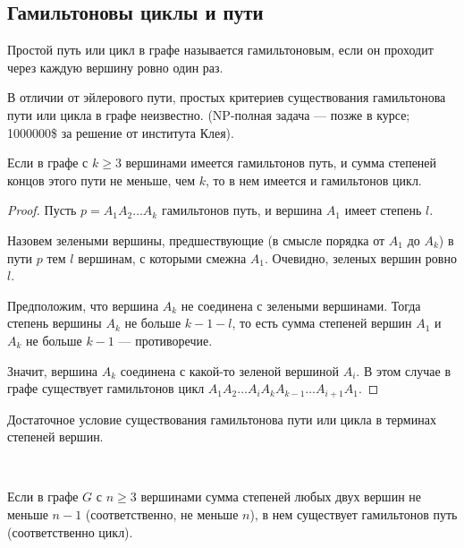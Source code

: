 \subsection{Гамильтоновы циклы и пути}

\begin{defn}
    Простой путь или цикл в графе называется гамильтоновым, если он проходит через каждую вершину ровно один раз.
\end{defn}

В отличии от эйлерового пути, простых критериев существования гамильтонова пути или цикла в графе неизвестно. (NP-полная задача --- позже в курсе; 1000000\$ за решение от института Клея).

\begin{lemma}
    Если в графе с $k \geq 3$ вершинами имеется гамильтонов путь, и сумма степеней концов этого пути не меньше, чем $k$, то в нем имеется и гамильтонов цикл.
\end{lemma}

\begin{proof}
    
    Пусть $p = A_1 A_2 \ldots A_k$ гамильтонов путь, и вершина $A_1$ имеет степень $l$.

    Назовем зелеными вершины, предшествующие (в смысле порядка от $A_1$ до $A_k$) в пути $p$ тем $l$ вершинам, с которыми смежна $A_1$. Очевидно, зеленых вершин ровно $l$.

    Предположим, что вершина $A_k$ не соединена с зелеными вершинами. Тогда степень вершины $A_k$ не больше $k - 1 - l$, то есть сумма степеней вершин $A_1$ и $A_k$ не больше $k - 1$ --- противоречие.

    Значит, вершина $A_k$ соединена с какой-то зеленой вершиной $A_i$. В этом случае в графе существует гамильтонов цикл $A_1 A_2 \ldots A_i A_k A_{k - 1} \ldots A_{i + 1} A_1$.
\end{proof}

Достаточное условие существования гамильтонова пути или цикла в терминах степеней вершин.

\begin{theorem}[Дирак, 1952]~
    
    Если в графе $G$ с $n \geq 3$ вершинами сумма степеней любых двух вершин не меньше $n - 1$ (соответственно, не меньше $n$), в нем существует гамильтонов путь (соответственно цикл).

\end{theorem}


